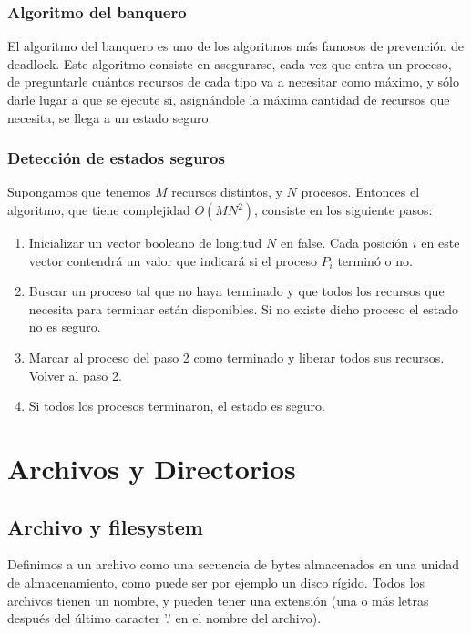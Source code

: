 \documentclass{article}
\begin{document}
\subsubsection{Algoritmo del banquero}

El algoritmo del banquero es uno de los algoritmos m\'as famosos de prevenci\'on de deadlock. Este algoritmo consiste en asegurarse, cada vez que entra un proceso, de preguntarle cu\'antos recursos de cada tipo va a necesitar como m\'aximo, y s\'olo darle lugar a que se ejecute si, asign\'andole la m\'axima cantidad de recursos que necesita, se llega a un estado seguro.

\subsubsection{Detecci\'on de estados seguros}

Supongamos que tenemos $M$ recursos distintos, y $N$ procesos. Entonces el algoritmo, que tiene complejidad $O(MN^2)$, consiste en los siguiente pasos:

\begin{enumerate}
\item Inicializar un vector booleano de longitud $N$ en false. Cada posición $i$ en este vector contendrá un valor que indicará si el proceso $P_i$ terminó o no.
\item Buscar un proceso tal que no haya terminado y que todos los recursos que necesita para terminar est\'an disponibles. Si no existe dicho proceso el estado no es seguro.
\item Marcar al proceso del paso 2 como terminado y liberar todos sus recursos. Volver al paso 2.
\item Si todos los procesos terminaron, el estado es seguro.
\end{enumerate}

\section{Archivos y Directorios}

\subsection{Archivo y filesystem}

Definimos a un archivo como una secuencia de bytes almacenados en una unidad de almacenamiento, como puede ser por ejemplo un disco r\'igido. Todos los archivos tienen un nombre, y pueden tener una extensi\'on (una o m\'as letras despu\'es del \'ultimo caracter '.' en el nombre del archivo).
\end{document}
